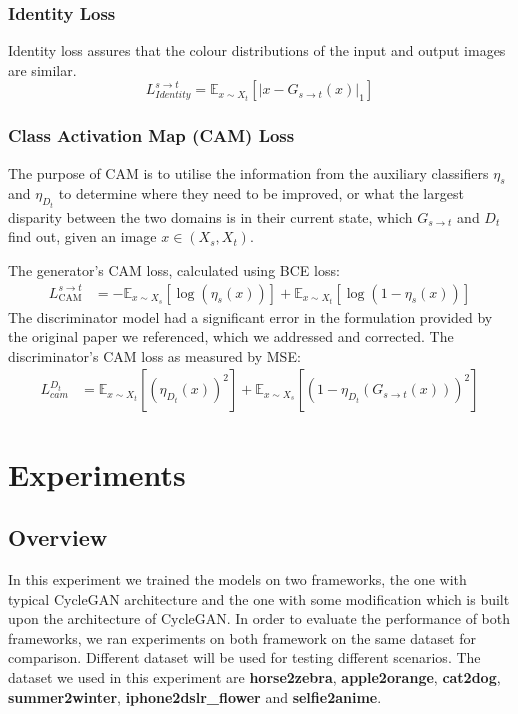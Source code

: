 \documentclass{article}
\begin{document}
\subsubsection{Identity Loss}
Identity loss assures that the colour distributions of the input and output images are similar.
$$ L_{Identity}^{s \rightarrow t}=\mathbb{E}_{x \sim X_{t}}\left[\left|x-G_{s \rightarrow t}(x)\right|_{1}\right] $$
\subsubsection{Class Activation Map (CAM) Loss}

The purpose of CAM \cite{U-GAT-IT} is to utilise the information from the auxiliary classifiers $\eta_{s}$ and $\eta_{D_{t}}$ to determine where they need to be improved, or what the largest disparity between the two domains is in their current state, which $G_{s \rightarrow t}$ and $D_{t}$ find out, given an image $x \in\left({X_{s}, X_{t}}\right)$.

The generator's CAM loss, calculated using BCE loss:
$$ \begin{aligned} L_{\text {CAM}}^{s \rightarrow t} &=-\mathbb{E}_{x \sim X_{s}}\left[\log \left(\eta_{s}(x)\right)\right]+\mathbb{E}_{x \sim X_{t}}\left[\log \left(1-\eta_{s}(x)\right)\right] \end{aligned} $$
The discriminator model had a significant error in the formulation provided by the original paper we referenced, which we addressed and corrected. The discriminator's CAM loss as measured by MSE:
$$ \begin{aligned} L_{c a m}^{D_{t}} &=\mathbb{E}_{x \sim X_{t}}\left[\left(\eta_{D_{t}}(x)\right)^{2}\right]+\mathbb{E}_{x \sim X_{s}}\left[\left(1-\eta_{D_{t}}\left(G_{s \rightarrow t}(x)\right)\right)^{2}\right] \end{aligned} $$




\section{Experiments}
\label{sec:expts}
\subsection{Overview}
In this experiment we trained the models on two frameworks, the one with typical CycleGAN architecture and the one with some modification which is built upon the architecture of CycleGAN. In order to evaluate the performance of both frameworks, we ran experiments on both framework on the same dataset for comparison. Different dataset will be used for testing different scenarios. The dataset we used in this experiment are \textbf{horse2zebra}, \textbf{apple2orange}, \textbf{cat2dog}, \textbf{summer2winter}, \textbf{iphone2dslr\_flower} and \textbf{selfie2anime}. 
\end{document}
